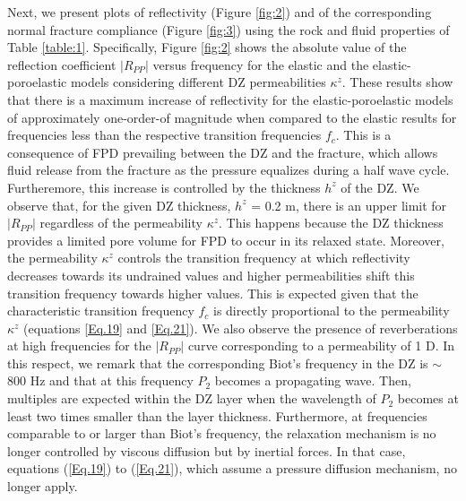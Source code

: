 \documentclass[draft]{agujournal2019}
\begin{document}
Next, we  present plots of reflectivity (Figure \ref{fig:2}) and of the corresponding  normal fracture compliance  (Figure \ref{fig:3}) using the rock and fluid properties of Table \ref{table:1}.
Specifically, Figure \ref{fig:2} shows the absolute value of the reflection coefficient $|R_{PP}|$ versus frequency for the elastic and the elastic-poroelastic models considering different DZ permeabilities $\kappa^z$. These results show that there is a maximum increase of reflectivity for the elastic-poroelastic models of approximately one-order-of magnitude when compared to the elastic results for frequencies less than the respective transition frequencies $f_c$. This is a consequence of FPD prevailing between the DZ and the fracture, which allows fluid release from the fracture as the pressure equalizes during a half wave cycle. 
Furtheremore, this increase is controlled by the thickness $h^z$ 
of the DZ. We observe that, for the given DZ thickness, $h^z$ = 0.2 m, there is an upper limit for $|R_{PP}|$ regardless of the permeability $\kappa^z$. This happens because the DZ thickness provides a limited pore volume for FPD to occur in its relaxed state. Moreover, the permeability $\kappa^z$ controls the transition frequency at which reflectivity decreases towards its undrained values and  higher permeabilities shift this transition frequency towards higher values. This is expected given that the characteristic transition frequency $f_c$ is directly proportional to the permeability $\kappa^z$ (equations \ref{Eq.19} and \ref{Eq.21}). We also observe the presence of reverberations at high frequencies for the $|R_{PP}|$ curve corresponding to a permeability of 1 D. In this respect, we remark that the corresponding Biot's frequency in the DZ is $ \sim$ 800 Hz and that at this frequency $P_2$ becomes a propagating wave. Then, multiples are expected within the DZ layer when the wavelength of $P_2$ becomes at least two times smaller than the layer thickness. Furthermore, at frequencies comparable to or larger than Biot's frequency, the relaxation mechanism is no longer controlled  by viscous diffusion but by inertial forces. In that case, equations (\ref{Eq.19}) to (\ref{Eq.21}), which assume a pressure diffusion mechanism, no longer apply.
\end{document}
